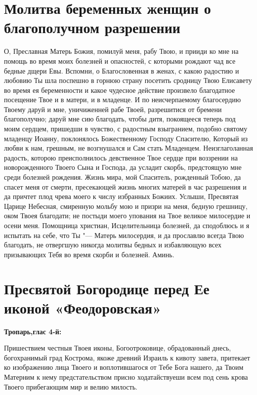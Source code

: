 \section{Молитва беременных женщин о благополучном разрешении}
 


О, Преславная Матерь Божия, помилуй меня, рабу Твою, и прииди ко мне на помощь во время моих болезней и опасностей, с которыми рождают чад все бедные дщери Евы. Вспомни, о Благословенная в женах, с какою радостию и любовию Ты шла поспешно в горнюю страну посетить сродницу Твою Елисавету во время ея беременности и какое чудесное действие произвело благодатное посещение Твое и в матери, и в младенце. И по неисчерпаемому благосердию Твоему даруй и мне, уничиженней рабе Твоей, разрешитися от бремени благополучно; даруй мне сию благодать, чтобы дитя, покоящееся теперь под моим сердцем, пришедши в чувство, с радостным взыгранием, подобно святому младенцу Иоанну, поклонялось Божественному Господу Спасителю, Который из любви к нам, грешным, не возгнушался и Сам стать Младенцем. Неизглаголанная радость, которою преисполнилось девственное Твое сердце при воззрении на новорожденного Твоего Сына и Господа, да усладит скорбь, предстоящую мне среди болезней рождения. Жизнь мира, мой Спаситель, рожденный Тобою, да спасет меня от смерти, пресекающей жизнь многих матерей в час разрешения и да причтет плод чрева моего к числу избранных Божиих. Услыши, Пресвятая Царице Небесная, смиренную мольбу мою и призри на меня, бедную грешницу, оком Твоея благодати; не постыди моего упования на Твое великое милосердие и осени меня. Помощница христиан, Исцелительница болезней, да сподоблюсь и я испытать на себе, что Ты "--- Матерь милосердия, и да прославлю всегда Твою благодать, не отвергшую никогда молитвы бедных и избавляющую всех призывающих Тебя во время скорби и болезней. Аминь. 


\newpage\section{Пресвятой Богородице перед Ее иконой «Феодоровская»}
 
\bfseries Тропарь,глас 4-й:\normalfont{}


Пришествием честныя Твоея иконы, Богоотроковице, обрадованный днесь, богохранимый град Кострома, якоже древний Израиль к кивоту завета, притекает ко изображению лица Твоего и воплотившагося от Тебе Бога нашего, да Твоим Матерним к нему предстательством присно ходатайствуеши всем под сень крова Твоего прибегающим мир и велию милость.


